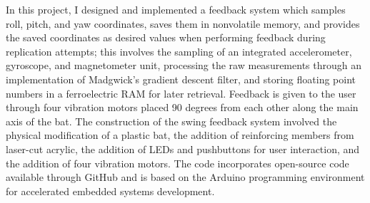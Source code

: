 % 
% 
%



In this project, I designed and implemented a feedback system which samples roll, pitch, and yaw coordinates, saves them in nonvolatile memory, and provides the saved coordinates as desired values when performing feedback during replication attempts; this involves the sampling of an integrated accelerometer, gyroscope, and magnetometer unit, processing the raw measurements through an implementation of Madgwick's gradient descent filter, and storing floating point numbers in a ferroelectric RAM for later retrieval.  Feedback is given to the user through four vibration motors placed 90 degrees from each other along the main axis of the bat.  The construction of the swing feedback system involved the physical modification of a plastic bat, the addition of reinforcing members from laser-cut acrylic, the addition of LEDs and pushbuttons for user interaction, and the addition of four vibration motors.  The code incorporates open-source code available through GitHub and is based on the Arduino programming environment for accelerated embedded systems development.
